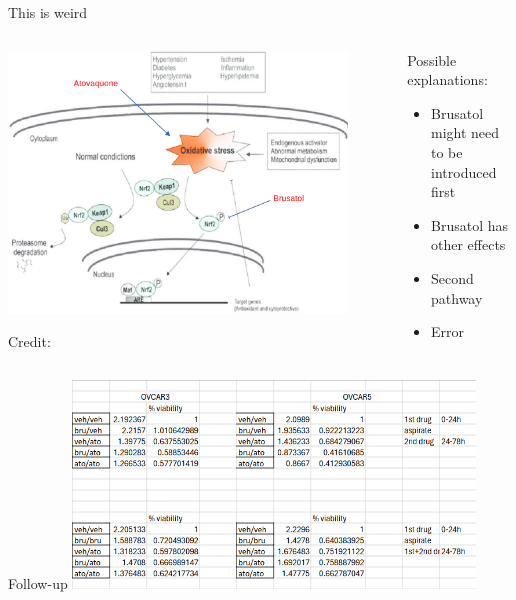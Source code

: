 \documentclass{beamer}
\begin{document}
\begin{frame}{This is weird}


    \begin{columns}
        \begin{column}{0.7\textwidth}
            \begin{center}
                \includegraphics[width = 0.9\textwidth]{figs/nrf2-pathway-annotated.png}


        \hspace*{15pt}\hbox{\scriptsize Credit:}
            \end{center}
        \end{column}
        \begin{column}{0.3\textwidth}
            
            Possible explanations: \begin{itemize}
                \item \alert<2>{Brusatol might need to be introduced first}
                \item Brusatol has other effects
                \item Second pathway
                \item Error
            \end{itemize}
        \end{column}
    \end{columns}
\end{frame}

\begin{frame}{Follow-up}
    \centering
    \includegraphics[width=0.8\textwidth]{figs/timed-synergy.png} 
\end{frame}
\end{document}
